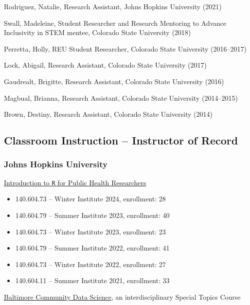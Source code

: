 \documentclass{cv}
\begin{document}
Rodriguez, Natalie, Research Assistant, Johns Hopkins University (2021)

Swall, Madeleine, Student Researcher and Research Mentoring to Advance Inclusivity in STEM mentee, Colorado State University (2018)

Perretta, Holly, REU Student Researcher, Colorado State University (2016--2017)

Lock, Abigail, Research Assistant, Colorado State University (2017)

Gaudrealt, Brigitte, Research Assistant, Colorado State University (2016)

Magbual, Brianna, Research Assistant, Colorado State University (2014--2015)

Brown, Destiny, Research Assistant, Colorado State University (2014)

\subsection*{Classroom Instruction -- Instructor of Record}

\subsubsection*{Johns Hopkins University}

\href{https://jhudatascience.org/intro_to_R_class/}{Introduction to \texttt{R} for Public Health Researchers}

\begin{itemize}

\item 140.604.73 -- Winter Institute 2024, enrollment: 28

\item 140.604.79 -- Summer Institute 2023, enrollment: 40

\item 140.604.73 -- Winter Institute 2023, enrollment: 23

\item 140.604.79  -- Summer Institute 2022, enrollment: 41

\item 140.604.73 -- Winter Institute 2022, enrollment: 27

\item 140.604.11 -- Summer Institute 2021, enrollment: 33

\end{itemize}

\href{https://jhudatascience.org/Baltimore_Community_Course/index.html}{Baltimore Community Data Science}, an interdisciplinary Special Topics Course
\end{document}
